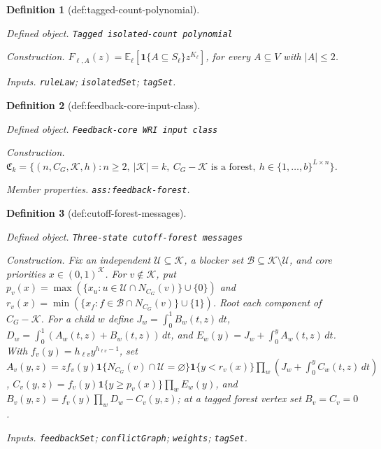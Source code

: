 \documentclass{article}
\newtheorem{definition}{Definition}
\begin{document}
\begin{definition}[def:tagged-count-polynomial]\label{def:tagged-count-polynomial}
\par\smallskip\noindent\emph{Defined object.} \texttt{Tagged isolated-\allowbreak{}count polynomial}
\par\smallskip\noindent\emph{Construction.} \(F_{\ell,A}(z)=\mathbb E_{\ell}[\mathbf 1\{A\subseteq S_{\ell}\}z^{K_{\ell}}]\), for every \(A\subseteq V\) with \(|A|\le2\).
\par\smallskip\noindent\emph{Inputs.} \texttt{ruleLaw}; \texttt{isolatedSet}; \texttt{tagSet}.
\end{definition}

\begin{definition}[def:feedback-core-input-class]\label{def:feedback-core-input-class}
\par\smallskip\noindent\emph{Defined object.} \texttt{Feedback-\allowbreak{}core WRI input class}
\par\smallskip\noindent\emph{Construction.} \(\mathfrak C_k=\{(n,C_G,\mathcal K,h):n\ge2,\ |\mathcal K|=k,\ C_G-\mathcal K\text{ is a forest},\ h\in\{1,\ldots,b\}^{L\times n}\}\).
\par\smallskip\noindent\emph{Member properties.} \texttt{ass:\allowbreak{}feedback-\allowbreak{}forest}.
\end{definition}

\begin{definition}[def:cutoff-forest-messages]\label{def:cutoff-forest-messages}
\par\smallskip\noindent\emph{Defined object.} \texttt{Three-\allowbreak{}state cutoff-\allowbreak{}forest messages}
\par\smallskip\noindent\emph{Construction.} Fix an independent \(\mathcal U\subseteq\mathcal K\), a blocker set \(\mathcal B\subseteq\mathcal K\setminus\mathcal U\), and core priorities \(x\in(0,1)^{\mathcal K}\). For \(v\notin\mathcal K\), put \(p_v(x)=\max(\{x_u:u\in\mathcal U\cap N_{C_G}(v)\}\cup\{0\})\) and \(r_v(x)=\min(\{x_f:f\in\mathcal B\cap N_{C_G}(v)\}\cup\{1\})\). Root each component of \(C_G-\mathcal K\). For a child \(w\) define \(J_w=\int_0^1B_w(t,z)\,dt\), \(D_w=\int_0^1(A_w(t,z)+B_w(t,z))\,dt\), and \(E_w(y)=J_w+\int_0^yA_w(t,z)\,dt\). With \(f_v(y)=h_{\ell v}y^{h_{\ell v}-1}\), set \(A_v(y,z)=zf_v(y)\mathbf 1\{N_{C_G}(v)\cap\mathcal U=\varnothing\}\mathbf 1\{y<r_v(x)\}\prod_w(J_w+\int_0^yC_w(t,z)\,dt)\), \(C_v(y,z)=f_v(y)\mathbf 1\{y\ge p_v(x)\}\prod_wE_w(y)\), and \(B_v(y,z)=f_v(y)\prod_wD_w-C_v(y,z)\); at a tagged forest vertex set \(B_v=C_v=0\).
\par\smallskip\noindent\emph{Inputs.} \texttt{feedbackSet}; \texttt{conflictGraph}; \texttt{weights}; \texttt{tagSet}.
\end{definition}
\end{document}
